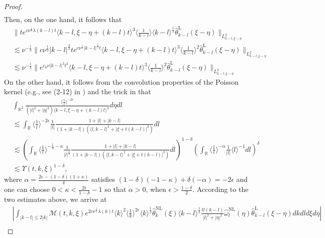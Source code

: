 \documentclass[reqno, 12pt]{amsart} %
\theoremstyle{plain} %
\theoremstyle{definition}
\theoremstyle{remark}
\numberwithin{equation}{section} %
\begin{document}
\begin{proof}
{\begin{equation}
\begin{aligned}
		\end{aligned}\end{equation} }
		Then, on the one hand, it follows that
		$$
		\begin{aligned}
			& \|t e^{c \nu^{\frac{1}{3}} \lambda(k-l) t}\langle k-l, \xi-\eta+(k-l) t\rangle^3\langle\frac{1}{k-l}\rangle \langle k-l \rangle^\frac13  \hat{\theta}_{k-l}^{\mathrm{L}}(\xi-\eta)\|_{L_{k-l, \xi-\eta}^2} \\
			&\lesssim  \nu^{-\frac{1}{3}}\|c \nu^{\frac{1}{3}}|k-l|^{\frac{2}{3}} t e^{c \nu^{\frac{1}{3}}|k-l|^\frac23  t}\langle k-l, \xi-\eta+(k-l) t\rangle^3\langle\frac{1}{k-l}\rangle^2 \hat{\theta}_{k-l}^{\mathrm{L}}(\xi-\eta)\|_{L_{k-l, \xi-\eta}^2} \\
			&\lesssim \nu^{-\frac{1}{3}}\|e^{c_0 \nu|k-l|^2 t^3}\langle k-l, \xi-\eta+(k-l) t\rangle^3\langle\frac{1}{k-l}\rangle^2 \hat{\theta}_{k-l}^{\mathrm{L}}(\xi-\eta)\|_{L_{k-l, \xi-\eta}^2}
		\end{aligned}
		$$
		On the other hand, it follows from the convolution properties of the Poisson kernel (e.g., see  (2-12) in \cite{WZ2023}) and the trick in \cite{LLZ2025} that
		$$
		\begin{aligned}
			& \int_{\mathbb{R}^2} \frac{\langle\frac{1}{l}\rangle^{-2 \epsilon}}{\left(|l|^2+|\eta|^2\right)\langle k-l, \xi-\eta+(k-l) t\rangle^2} d \eta d l \\
			&\lesssim  \int_{\mathbb{R}}\langle\frac{1}{l}\rangle^{-2 \epsilon} \frac{1}{|l|} \frac{1+|l|+|k-l|}{(1+|k-l|)\left(\langle l, k-l\rangle^2+|\xi+t(k-l)|^2\right)} d l \\
			&\lesssim  \left(\int_{\mathbb{R}}\langle\frac{1}{l}\rangle^{-\frac{1}{3}-\kappa} \frac{1}{|l|^{\frac{1}{3}}}\frac{1+|l|+|k-l|}{(1+|k-l|)\left(\langle l, k-l\rangle^2+|\xi+t(k-l)|^2\right)} d l\right)^{1-\delta}\left(\int_{\mathbb{R}}\langle\frac{1}{l}\rangle^{-\alpha} \frac{1}{|l|}\langle l\rangle^{-1} d l\right)^\delta \\
			&\lesssim  \Upsilon(t, k, \xi)^{1-\delta},
		\end{aligned}
		$$
		where $\alpha=\frac{2 \epsilon-(1-\delta)(1+\kappa)}{\delta}$ satisfies
		$(1-\delta)(-1-\kappa)+\delta(-\alpha)=-2 \epsilon$ 
		and one can choose $0<\kappa<\frac{2 \epsilon}{1-\delta}-1$ so that $\alpha>0$, when $\epsilon>\frac{1-\delta}{2}$. According to the two estimates above, we arrive at
		$$
		\begin{aligned}
			& \left|\int_{|k-l| \leq 2|k|} \mathcal{M}(t, k, \xi) e^{2 c \nu^{\frac{1}{3}} \lambda(k) t}\langle k\rangle^2\langle\frac{1}{k}\rangle^{2 \epsilon} \langle k \rangle^\frac13\hat{\theta}_k^{\mathrm{NL}}(\xi) \langle k-l \rangle^\frac13  \frac{t l(k-l)}{|l|^2+|\eta|^2} \hat{\omega}_l^{\mathrm{NL}}(\eta) \hat{\theta}_{k-l}^{\mathrm{L}}(\xi-\eta) d k d l d \xi d \eta\right| \\

\end{aligned}$$
\end{proof}
\end{document}
